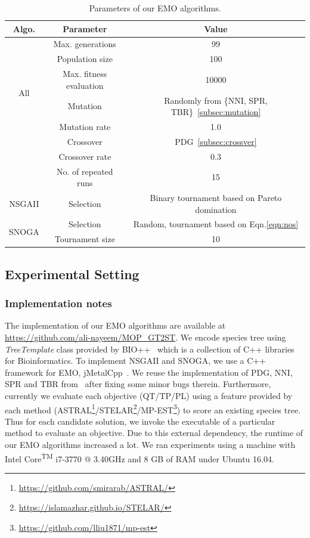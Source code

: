\begin{table}[!htbp]
	\centering
	\small
	\caption{Parameters of our EMO algorithms.}
	\begin{tabular}{|c||c|c|} \hline
		Algo. & \multicolumn{1}{c|}{Parameter} & Value \\
		\hline
		\multirow{6}{*}{All} & Max. generations & 99 \\	
		\cline{2-3}          & Population size & 100 \\ \cline{2-3} & Max. fitness evaluation & 10000 \\	
		\cline{2-3}          &  Mutation & Randomly from \{NNI, SPR, TBR\}~\ref{subsec:mutation} \\
		\cline{2-3}          & Mutation rate & 1.0 \\
		\cline{2-3}          & Crossover  & PDG~\ref{subsec:crossver} \\
		\cline{2-3}          & Crossover rate & 0.3 \\ \cline{2-3}          & No. of repeated runs & 15 \\
		\hline \hline
		\multirow{1}{*}{NSGAII} & Selection & Binary tournament based on Pareto domination \\ \hline \hline
		\multirow{2}{*}{SNOGA} & Selection & Random,  tournament based on Eqn.\ref{eqn:nos} \\ \cline{2-3}          & Tournament size & 10 \\ \hline
	\end{tabular}\label{tab:parameters}\end{table}\subsection{Experimental Setting}
\subsubsection{Implementation notes}
The implementation of our EMO algorithms are available at \url{https://github.com/ali-nayeem/MOP_GT2ST}. We encode species tree using \textit{TreeTemplate} class provided by BIO++~\cite{gueguen2013bpp} which is a collection of C++ libraries for Bioinformatics. To implement NSGAII and SNOGA, we use a C++ framework for EMO, jMetalCpp~\cite{lopez2013jmetalcpp}. We reuse the implementation of PDG, NNI, SPR and TBR from~\cite{zambrano2016mo} after fixing some minor bugs therein. Furthermore, currently we evaluate each objective (QT/TP/PL) using a feature provided by each method (ASTRAL\footnote{\url{https://github.com/smirarab/ASTRAL/}}/STELAR\footnote{\url{https://islamazhar.github.io/STELAR/}}/MP-EST\footnote{\url{https://github.com/lliu1871/mp-est}}) to score an existing species tree. Thus for each candidate solution, we invoke the executable of a particular method to evaluate an objective. Due to this external dependency, the runtime of our EMO algorithms increased a lot. We ran experiments using a machine with Intel \textsuperscript{\textregistered} Core\textsuperscript{TM} i7-3770 @ 3.40GHz and 8 GB of RAM under Ubuntu 16.04.


